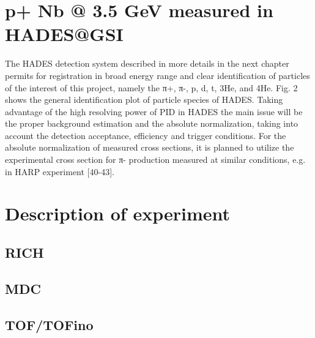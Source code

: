\section{p+ Nb @ 3.5 GeV measured in HADES@GSI}
The HADES detection system described in more details in the next chapter permits for registration in broad energy range and clear identification of particles of the interest of this project, namely the π+, π-, p, d, t, 3He, and 4He. Fig. 2 shows the general identification plot of particle species of HADES. Taking advantage of the high resolving power of PID in HADES the main issue will be the proper background estimation and the absolute normalization, taking into account the detection acceptance, efficiency and trigger conditions. For the absolute normalization of measured cross sections, it is planned to utilize the experimental cross section for π- production measured at similar conditions, e.g. in HARP experiment [40-43].  
\section{Description of experiment}
\subsection{RICH}
\subsection{MDC}
\subsection{TOF/TOFino}
